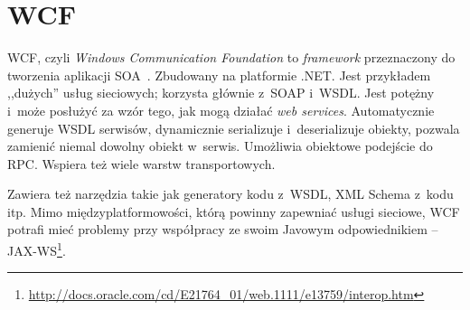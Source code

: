 %
%
%
%
%
%
%
%
%
%
%
%
%




\section{WCF}
WCF, czyli \emph{Windows Communication Foundation} to \emph{framework} przeznaczony do tworzenia aplikacji SOA~\cite{wcf}. Zbudowany na platformie .NET.
Jest przykładem ,,dużych'' usług sieciowych; korzysta głównie z~SOAP i~WSDL.
Jest potężny i~może posłużyć za wzór tego, jak mogą działać \emph{web services}.
Automatycznie generuje WSDL serwisów, dynamicznie serializuje i~deserializuje obiekty, pozwala zamienić niemal dowolny obiekt w~serwis.
Umożliwia obiektowe podejście do RPC.
Wspiera też wiele warstw transportowych.

Zawiera też narzędzia takie jak generatory kodu z~WSDL, XML Schema z~kodu itp.
Mimo międzyplatformowości, którą powinny zapewniać usługi sieciowe, WCF potrafi mieć problemy przy współpracy ze swoim Javowym odpowiednikiem -- JAX-WS\footnote{\url{http://docs.oracle.com/cd/E21764_01/web.1111/e13759/interop.htm}}.

